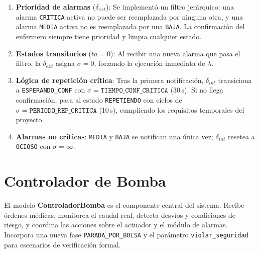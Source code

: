 \documentclass[12pt, a4paper]{article}
\begin{document}
\begin{enumerate}
    \item \textbf{Prioridad de alarmas} ($\delta_{\mathit{ext}}$):
    Se implementó un filtro jerárquico: una alarma \texttt{CRITICA} activa no puede
    ser reemplazada por ninguna otra, y una alarma \texttt{MEDIA} activa no es
    reemplazada por una \texttt{BAJA}. La confirmación del enfermero siempre tiene
    prioridad y limpia cualquier estado.

    \item \textbf{Estados transitorios} ($ta = 0$): Al recibir una nueva alarma que
    pasa el filtro, la $\delta_{\mathit{ext}}$ asigna $\sigma = 0$, forzando la
    ejecución inmediata de $\lambda$.

    \item \textbf{Lógica de repetición crítica}: Tras la primera notificación,
    $\delta_{\mathit{int}}$ transiciona a \texttt{ESPERANDO\_CONF} con
    $\sigma = \texttt{TIEMPO\_CONF\_CRITICA}$ (30\,s). Si no llega confirmación,
    pasa al estado \texttt{REPETIENDO} con ciclos de $\sigma = \texttt{PERIODO\_REP\_CRITICA}$
    (10\,s), cumpliendo los requisitos temporales del proyecto.

    \item \textbf{Alarmas no críticas}: \texttt{MEDIA} y \texttt{BAJA} se notifican
    una única vez; $\delta_{\mathit{int}}$ resetea a \texttt{OCIOSO} con $\sigma = \infty$.
\end{enumerate}

\section{Controlador de Bomba}

El modelo \textbf{ControladorBomba} es el componente central del sistema. Recibe
órdenes médicas, monitorea el caudal real, detecta desvíos y condiciones de riesgo,
y coordina las acciones sobre el actuador y el módulo de alarmas. Incorpora una
nueva fase \texttt{PARADA\_POR\_BOLSA} y el parámetro \texttt{violar\_seguridad}
para escenarios de verificación formal.
\end{document}
